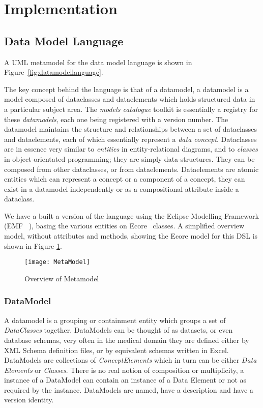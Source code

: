 \section{Implementation}

\subsection{Data Model Language}

A UML metamodel for the data model language is shown in
Figure~\ref{fig:datamodellanguage}. 


The key concept behind the language is that of a datamodel, a
datamodel is a model composed of dataclasses and dataelements which
holds structured data in a particular subject area. The \emph{models
  catalogue} toolkit is essentially a registry for these
\emph{datamodels}, each one being registered with a version
number. The datamodel maintains the structure and relationships
between a set of dataclasses and dataelements, each of which
essentially represent a \emph{data concept}. Dataclasses are in
essence very similar to \emph{entities} in entity-relational diagrams,
and to \emph{classes} in object-orientated programming; they are
simply data-structures. They can be composed from other dataclasses,
or from dataelements. Dataelements are atomic entities which can
represent a concept or a component of a concept, they can exist in a
datamodel independently or as a compositional attribute inside a
dataclass. 

We have a built a version of the language using the Eclipse Modelling
Framework (EMF ~\cite{EMF}), basing the various entities on
Ecore~\cite{ECORE} classes. A simplified overview model, without
attributes and methods, showing the Ecore model for this DSL is shown
in Figure \ref{fig:mcSimplifiedOverview}.


\begin{figure}[here]
  \texttt{[image: MetaModel]}
  \caption{Overview of Metamodel} 
  \label{fig:mcSimplifiedOverview}
\end{figure}

\subsubsection{DataModel}

A datamodel is a grouping or containment entity which groups a set of
\emph{DataClasses} together. DataModels can be thought of as datasets,
or even database schemas, very often in the medical domain they are
defined either by XML Schema definition files, or by equivalent
schemas written in Excel.  DataModels are collections of
\emph{ConceptElements} which in turn can be either \emph{Data
  Elements} or \emph{Classes}. There is no real notion of composition
or multiplicity, a instance of a DataModel can contain an instance of
a Data Element or not as required by the instance.  DataModels are
named, have a description and have a version identity.

